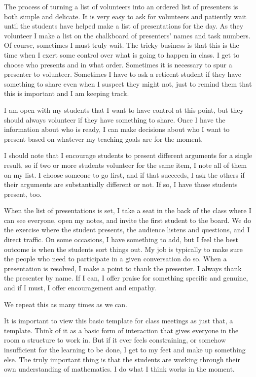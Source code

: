 \documentclass{tufte-handout}
\theoremstyle{definition}
\begin{document}
The process of turning a list of volunteers into an ordered list of presenters is both simple and delicate. It is very easy to ask for volunteers and patiently wait until the students have helped make a list of presentations for the day. As they volunteer I make a list on the chalkboard of presenters' names and task numbers. Of course, sometimes I must truly wait. The tricky business is that this is the time when I exert some control over what is going to happen in class. I get to choose who presents and in what order. Sometimes it is necessary to spur a presenter to volunteer. Sometimes I have to ask a reticent student if they have something to share even when I suspect they might not, just to remind them that this is important and I am keeping track.

I am open with my students that I want to have control at this point, but they should always volunteer if they have something to share. Once I have the information about who is ready, I can make decisions about who I want to present based on whatever my teaching goals are for the moment.

I should note that I encourage students to present different arguments for a single result, so if two or more students volunteer for the same item, I note all of them on my list. I choose someone to go first, and if that succeeds, I ask the others if their arguments are substantially different or not. If so, I have those students present, too.

When the list of presentations is set, I take a seat in the back of the class where I can see everyone, open my notes, and invite the first student to the board. We do the exercise where the student presents, the audience listens and questions, and I direct traffic. On some occasions, I have something to add, but I feel the best outcome is when the students sort things out. My job is typically to make sure the people who need to participate in a given conversation do so. When a presentation is resolved, I make a point to thank the presenter. I always thank the presenter by name. If I can, I offer praise for something specific and genuine, and if I must, I offer encouragement and empathy.

We repeat this as many times as we can.

It is important to view this basic template for class meetings as just that, a template. Think of it as a basic form of interaction that gives everyone in the room a structure to work in. But if it ever feels constraining, or somehow insufficient for the learning to be done, I get to my feet and make up something else. The truly important thing is that the students are working through their own understanding of mathematics. I do what I think works in the moment.
\end{document}
